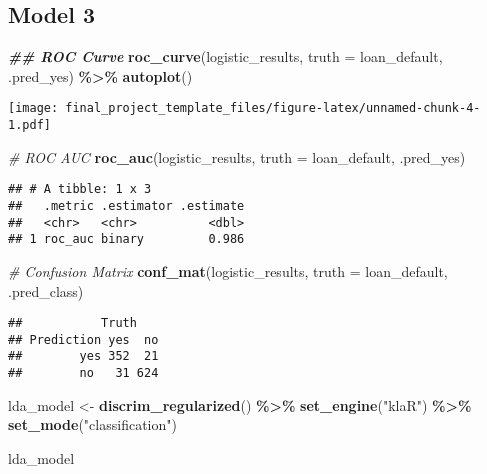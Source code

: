 \documentclass[
]{article}
\newenvironment{Shaded}{\begin{snugshade}}{\end{snugshade}}
\newcommand{\AttributeTok}[1]{\textcolor[rgb]{0.13,0.29,0.53}{#1}}
\newcommand{\CommentTok}[1]{\textcolor[rgb]{0.56,0.35,0.01}{\textit{#1}}}
\newcommand{\DocumentationTok}[1]{\textcolor[rgb]{0.56,0.35,0.01}{\textbf{\textit{#1}}}}
\newcommand{\FunctionTok}[1]{\textcolor[rgb]{0.13,0.29,0.53}{\textbf{#1}}}
\newcommand{\NormalTok}[1]{#1}
\newcommand{\OtherTok}[1]{\textcolor[rgb]{0.56,0.35,0.01}{#1}}
\newcommand{\SpecialCharTok}[1]{\textcolor[rgb]{0.81,0.36,0.00}{\textbf{#1}}}
\newcommand{\StringTok}[1]{\textcolor[rgb]{0.31,0.60,0.02}{#1}}
\begin{document}
\subsection{Model 3}\label{model-3}

\begin{Shaded}
\begin{Highlighting}[]
\DocumentationTok{\#\# ROC Curve}
  \FunctionTok{roc\_curve}\NormalTok{(logistic\_results, }\AttributeTok{truth =}\NormalTok{ loan\_default, .pred\_yes) }\SpecialCharTok{\%\textgreater{}\%}
  \FunctionTok{autoplot}\NormalTok{()}
\end{Highlighting}
\end{Shaded}

\texttt{[image: final\_project\_template\_files/figure-latex/unnamed-chunk-4-1.pdf]}

\begin{Shaded}
\begin{Highlighting}[]
\CommentTok{\# ROC AUC}
\FunctionTok{roc\_auc}\NormalTok{(logistic\_results, }\AttributeTok{truth =}\NormalTok{ loan\_default, .pred\_yes)}
\end{Highlighting}
\end{Shaded}

\begin{verbatim}
## # A tibble: 1 x 3
##   .metric .estimator .estimate
##   <chr>   <chr>          <dbl>
## 1 roc_auc binary         0.986
\end{verbatim}

\begin{Shaded}
\begin{Highlighting}[]
\CommentTok{\# Confusion Matrix}
\FunctionTok{conf\_mat}\NormalTok{(logistic\_results, }\AttributeTok{truth =}\NormalTok{ loan\_default, .pred\_class)}
\end{Highlighting}
\end{Shaded}

\begin{verbatim}
##           Truth
## Prediction yes  no
##        yes 352  21
##        no   31 624
\end{verbatim}

\begin{Shaded}
\begin{Highlighting}[]
\NormalTok{lda\_model }\OtherTok{\textless{}{-}} \FunctionTok{discrim\_regularized}\NormalTok{() }\SpecialCharTok{\%\textgreater{}\%} 
             \FunctionTok{set\_engine}\NormalTok{(}\StringTok{"klaR"}\NormalTok{) }\SpecialCharTok{\%\textgreater{}\%} 
             \FunctionTok{set\_mode}\NormalTok{(}\StringTok{"classification"}\NormalTok{)}

\NormalTok{lda\_model}
\end{Highlighting}
\end{Shaded}
\end{document}
